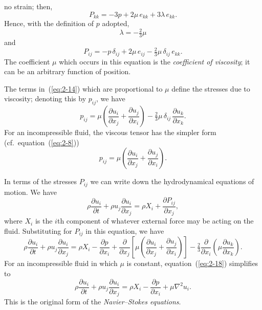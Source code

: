 no strain; then,
\begin{equation}
\label{eq:2-12}
P_{kk} = -3p + 2\mu\,e_{kk} + 3\lambda\,e_{kk}.
\end{equation}
Hence, with the definition of $p$ adopted,
\begin{equation}
\label{eq:2-13}
\lambda = -\tfrac{2}{3}\mu
\end{equation}
and
\begin{equation}
\label{eq:2-14}
P_{ij} = -p\,\delta_{ij} + 2\mu\,e_{ij} - \tfrac{2}{3}\mu\,\delta_{ij}\,e_{kk}.
\end{equation}
The coefficient $\mu$ which occurs in this equation is the \emph{coefficient of viscosity};
it can be an arbitrary function of position.

The terms in~(\ref{eq:2-14}) which are proportional to $\mu$ define the stresses due
to viscosity; denoting this by $p_{ij}$, we have
\begin{equation}
\label{eq:2-15}
p_{ij} = \mu\!\left(\frac{\partial u_i}{\partial x_j}+\frac{\partial u_j}{\partial x_i}\right) - \tfrac{2}{3}\mu\,\delta_{ij}\,\frac{\partial u_k}{\partial x_k}.
\end{equation}
For an incompressible fluid, the viscous tensor has the simpler form
(cf.\ equation~(\ref{eq:2-8}))
\begin{equation}
\label{eq:2-16}
p_{ij} = \mu\!\left(\frac{\partial u_i}{\partial x_j}+\frac{\partial u_j}{\partial x_i}\right)\!.
\end{equation}

In terms of the stresses $P_{ij}$ we can write down the hydrodynamical
equations of motion. We have
\begin{equation}
\label{eq:2-17}
\rho\frac{\partial u_i}{\partial t} + \rho u_j\frac{\partial u_i}{\partial x_j} = \rho X_i + \frac{\partial P_{ij}}{\partial x_j},
\end{equation}
where $X_i$ is the $i$th component of whatever external force may be acting
on the fluid. Substituting for $P_{ij}$ in this equation, we have
\begin{equation}
\label{eq:2-18}
\rho\frac{\partial u_i}{\partial t} + \rho u_j\frac{\partial u_i}{\partial x_j} = \rho X_i - \frac{\partial p}{\partial x_i} + \frac{\partial}{\partial x_j}\!\left[\mu\!\left(\frac{\partial u_i}{\partial x_j}+\frac{\partial u_j}{\partial x_i}\right)\right] - \tfrac{2}{3}\frac{\partial}{\partial x_i}\!\left(\mu\frac{\partial u_k}{\partial x_k}\right)\!.
\end{equation}
For an incompressible fluid in which $\mu$ is constant, equation~(\ref{eq:2-18}) simplifies to
\begin{equation}
\label{eq:2-19}
\rho\frac{\partial u_i}{\partial t} + \rho u_j\frac{\partial u_i}{\partial x_j} = \rho X_i - \frac{\partial p}{\partial x_i} + \mu\nabla^2 u_i.
\end{equation}
This is the original form of the \emph{Navier--Stokes equations}.

